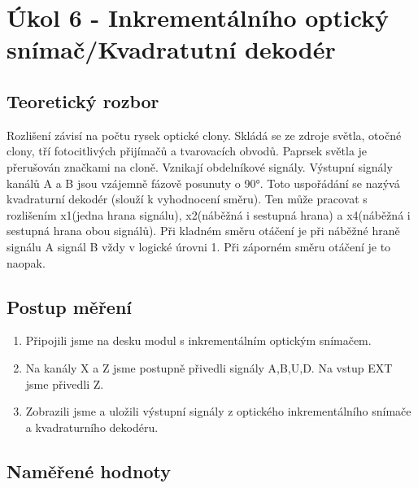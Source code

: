 \documentclass{protokol}
\begin{document}
\pagebreak



\section{Úkol 6 - Inkrementálního optický snímač/Kvadratutní dekodér}
    \subsection{Teoretický rozbor}
    \noindent Rozlišení závisí na počtu rysek optické clony. Skládá se ze zdroje světla, otočné clony, tří fotocitlivých přijímačů a tvarovacích obvodů. Paprsek světla je přerušován značkami na cloně. Vznikají obdelníkové signály. Výstupní signály kanálů A a B jsou vzájemně fázově posunuty o 90°. Toto uspořádání se nazývá kvadraturní dekodér (slouží k vyhodnocení směru). Ten může pracovat s rozlišením x1(jedna hrana signálu), x2(náběžná i sestupná hrana) a x4(náběžná i sestupná hrana obou signálů). Při kladném směru otáčení je při náběžné hraně signálu A signál B vždy v logické úrovni 1. Při záporném směru otáčení je to naopak. 

    \subsection{Postup měření}
    \begin{enumerate}
        \item Připojili jsme na desku modul s inkrementálním optickým snímačem.
        \item Na kanály X a Z jsme postupně přivedli signály A,B,U,D. Na vstup EXT jsme přivedli Z.
        \item Zobrazili jsme a uložili výstupní signály z optického inkrementálního snímače a kvadraturního dekodéru.
    \end{enumerate}


    \clearpage
    \subsection{Naměřené hodnoty}
\end{document}
